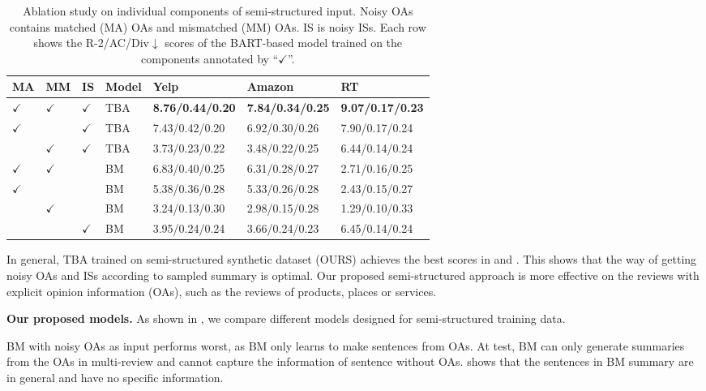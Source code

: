\begin{table}[th]
	\centering
	\small
	\begin{tabular}{|p{0.25cm}p{0.25cm}p{0.25cm}p{0.55cm}m{1.55cm}<{\centering}m{1.55cm}<{\centering}m{1.55cm}<{\centering}|}
		\hline
		MA & MM & IS & \bf Model & \bf Yelp & \bf Amazon & \bf RT \\
		\hline
		$\checkmark$ & $\checkmark$ & $\checkmark$ &TBA& \bf 8.76/0.44/0.20 & \bf 7.84/0.34/0.25 & \bf 9.07/0.17/0.23 \\
		$\checkmark$ &  & $\checkmark$&TBA& 7.43/0.42/0.20 & 6.92/0.30/0.26 & 7.90/0.17/0.24 \\
		& $\checkmark$ & $\checkmark$&TBA & 3.73/0.23/0.22 & 3.48/0.22/0.25& 6.44/0.14/0.24  \\
		\hline
		$\checkmark$ & $\checkmark$ & & BM& 6.83/0.40/0.25& 6.31/0.28/0.27 & 2.71/0.16/0.25  \\
		$\checkmark$ &  & & BM & 5.38/0.36/0.28& 5.33/0.26/0.28 & 2.43/0.15/0.27 \\
		& $\checkmark$ & & BM & 3.24/0.13/0.30 & 2.98/0.15/0.28& 1.29/0.10/0.33 \\
		\hline
		& & $\checkmark$ & BM & 3.95/0.24/0.24 & 3.66/0.24/0.23& 6.45/0.14/0.24  \\
		\hline
	\end{tabular}
	\caption{Ablation study on individual components of semi-structured input. 
		Noisy OAs contains matched (MA) OAs and mismatched (MM) OAs. IS is noisy ISs. 
		Each row shows the R-2/AC/Div$\downarrow$ scores of the  BART-based model trained on the components annotated by ``$\checkmark$''.}
	\label{tab:abl_comp}
\end{table}

In general, TBA trained on semi-structured synthetic dataset (OURS) achieves the best scores in  and . This shows that the way of getting noisy OAs and ISs according to sampled summary is optimal.
Our proposed semi-structured approach is more effective on the reviews with explicit opinion information (OAs), such as the reviews of products, places or services.

\textbf{Our proposed models.}
As shown in ,
we compare different models designed for semi-structured training data.

BM with noisy OAs as input performs worst,
as BM only learns to make sentences from OAs. 
At test, BM can only generate summaries
from the OAs in multi-review and cannot capture the information of sentence without OAs. 
 shows that the sentences in BM summary
are in general and have no specific information.

